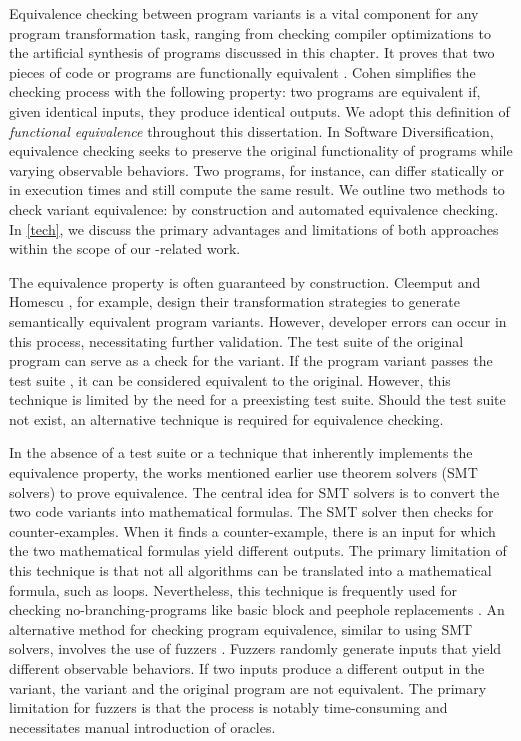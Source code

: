Equivalence checking between program variants is a vital component for any program transformation task, ranging from checking compiler optimizations \cite{LeCompilers} to the artificial synthesis of programs discussed in this chapter. 
It proves that two pieces of code or programs are functionally equivalent \cite{churchill2019}. 
Cohen \cite{cohen1993operating} simplifies the checking process with the following property: two programs are equivalent if, given identical inputs, they produce identical outputs. 
We adopt this definition of \emph{functional equivalence} throughout this dissertation. 
In Software Diversification, equivalence checking seeks to preserve the original functionality of programs while varying observable behaviors. 
Two programs, for instance, can differ statically or in execution times and still compute the same result. 
We outline two methods to check variant equivalence: by construction and automated equivalence checking.
In \autoref{tech}, we discuss the primary advantages and limitations of both approaches within the scope of our \Wasm-related work.

 The equivalence property is often guaranteed by construction. 
Cleemput \etal \cite{Cleemput2012} and Homescu \etal \cite{homescu2013profile}, for example, design their transformation strategies to generate semantically equivalent program variants. 
However, developer errors can occur in this process, necessitating further validation. 
The test suite of the original program can serve as a check for the variant. 
If the program variant passes the test suite \cite{harrand2020java}, it can be considered equivalent to the original. 
However, this technique is limited by the need for a preexisting test suite. 
Should the test suite not exist, an alternative technique is required for equivalence checking.

 In the absence of a test suite or a technique that inherently implements the equivalence property, the works mentioned earlier use theorem solvers (SMT solvers) \cite{SMT_solver} to prove equivalence. 
The central idea for SMT solvers is to convert the two code variants into mathematical formulas. 
The SMT solver then checks for counter-examples. When it finds a counter-example, there is an input for which the two mathematical formulas yield different outputs. 
The primary limitation of this technique is that not all algorithms can be translated into a mathematical formula, such as loops. 
Nevertheless, this technique is frequently used for checking no-branching-programs like basic block and peephole replacements \cite{SuperoptimizationScaling}.
An alternative method for checking program equivalence, similar to using SMT solvers, involves the use of fuzzers \cite{zalewski2017american}.
Fuzzers randomly generate inputs that yield different observable behaviors. 
If two inputs produce a different output in the variant, the variant and the original program are not equivalent. 
The primary limitation for fuzzers is that the process is notably time-consuming and necessitates manual introduction of oracles.



